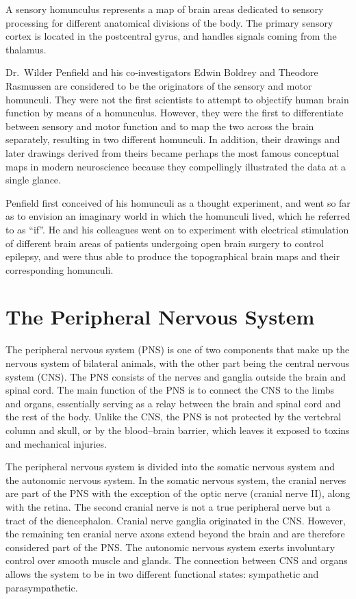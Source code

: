 A sensory homunculus represents a map of brain areas dedicated to sensory processing for different anatomical divisions of the body. The primary sensory cortex is located in the postcentral gyrus, and handles signals coming from the thalamus.

Dr.~Wilder Penfield and his co-investigators Edwin Boldrey and Theodore Rasmussen are considered to be the originators of the sensory and motor homunculi. They were not the first scientists to attempt to objectify human brain function by means of a homunculus. However, they were the first to differentiate between sensory and motor function and to map the two across the brain separately, resulting in two different homunculi. In addition, their drawings and later drawings derived from theirs became perhaps the most famous conceptual maps in modern neuroscience because they compellingly illustrated the data at a single glance.

Penfield first conceived of his homunculi as a thought experiment, and went so far as to envision an imaginary world in which the homunculi lived, which he referred to as ``if''. He and his colleagues went on to experiment with electrical stimulation of different brain areas of patients undergoing open brain surgery to control epilepsy, and were thus able to produce the topographical brain maps and their corresponding homunculi.

\hypertarget{the-peripheral-nervous-system}{%
\chapter{The Peripheral Nervous System}\label{the-peripheral-nervous-system}}

The peripheral nervous system (PNS) is one of two components that make up the nervous system of bilateral animals, with the other part being the central nervous system (CNS). The PNS consists of the nerves and ganglia outside the brain and spinal cord. The main function of the PNS is to connect the CNS to the limbs and organs, essentially serving as a relay between the brain and spinal cord and the rest of the body. Unlike the CNS, the PNS is not protected by the vertebral column and skull, or by the blood--brain barrier, which leaves it exposed to toxins and mechanical injuries.

The peripheral nervous system is divided into the somatic nervous system and the autonomic nervous system. In the somatic nervous system, the cranial nerves are part of the PNS with the exception of the optic nerve (cranial nerve II), along with the retina. The second cranial nerve is not a true peripheral nerve but a tract of the diencephalon. Cranial nerve ganglia originated in the CNS. However, the remaining ten cranial nerve axons extend beyond the brain and are therefore considered part of the PNS. The autonomic nervous system exerts involuntary control over smooth muscle and glands. The connection between CNS and organs allows the system to be in two different functional states: sympathetic and parasympathetic.

